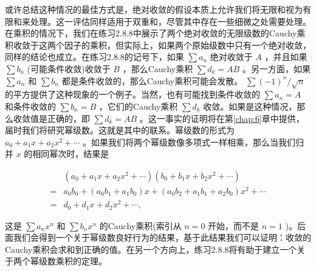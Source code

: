 或许总结这种情况的最佳方式是，绝对收敛的假设本质上允许我们将无限和视为有限和来处理。这一评估同样适用于双重和，尽管其中存在一些细微之处需要处理。在乘积的情况下，我们在练习2.8.8中展示了两个绝对收敛的无限级数的Cauchy乘积收敛于这两个因子的乘积，但实际上，如果两个原始级数中只有一个绝对收敛，同样的结论也成立。在练习2.8.8的记号下，如果 \(\sum {a}_{n}\) 绝对收敛于 \(A\) ，并且如果 \(\sum {b}_{n}\) (可能条件收敛)收敛于 \(B\) ，那么Cauchy乘积 \(\sum {d}_{k} = {AB}\) 。另一方面，如果 \(\sum {a}_{n}\) 和 \(\sum {b}_{n}\) 都是条件收敛的，那么Cauchy乘积可能会发散。 \(\sum {\left( -1\right) }^{n}/\sqrt{n}\) 的平方提供了这种现象的一个例子。当然，也有可能找到条件收敛的 \(\sum {a}_{n} = A\) 和条件收敛的 \(\sum {b}_{n} = B\) ，它们的Cauchy乘积 \(\sum {d}_{k}\) 收敛。如果是这种情况，那么收敛值是正确的，即 \(\sum {d}_{k} = {AB}\) 。这一事实的证明将在第\ref{chap:6}章中提供，届时我们将研究幂级数。这就是其中的联系。幂级数的形式为 \({a}_{0} + {a}_{1}x + {a}_{2}{x}^{2} + \cdots\) 。如果我们将两个幂级数像多项式一样相乘，那么当我们归并 \(x\) 的相同幂次时，结果是

\begin{align*}
&\left( {{a}_{0} + {a}_{1}x + {a}_{2}{x}^{2} + \cdots }\right) \left( {{b}_{0} + {b}_{1}x + {b}_{2}{x}^{2} + \cdots }\right)\\
= & {a}_{0}{b}_{0} + \left( {{a}_{0}{b}_{1} + {a}_{1}{b}_{0}}\right) x + \left( {{a}_{0}{b}_{2} + {a}_{1}{b}_{1} + {a}_{2}{b}_{0}}\right) {x}^{2} + \cdots\\
= & {d}_{0} + {d}_{1}x + {d}_{2}{x}^{2} + \cdots ,
\end{align*}

这是 \(\sum {a}_{n}{x}^{n}\) 和 \(\sum {b}_{n}{x}^{n}\) 的Cauchy乘积(索引从 \(n = 0\) 开始，而不是 \(n = 1\) )。后面我们会得到一个关于幂级数良好行为的结果，基于此结果我们可以证明：收敛的Cauchy乘积会求和到正确的值。在另一个方向上，练习2.8.8将有助于建立一个关于两个幂级数乘积的定理。

